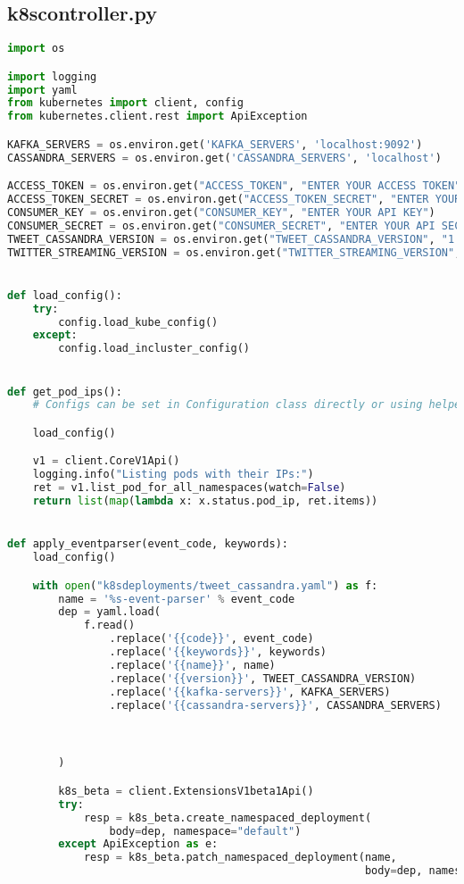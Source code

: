 \newpage
\subsection{k8scontroller.py}

\begin{lstlisting}[language=Python]
import os

import logging
import yaml
from kubernetes import client, config
from kubernetes.client.rest import ApiException

KAFKA_SERVERS = os.environ.get('KAFKA_SERVERS', 'localhost:9092')
CASSANDRA_SERVERS = os.environ.get('CASSANDRA_SERVERS', 'localhost')

ACCESS_TOKEN = os.environ.get("ACCESS_TOKEN", "ENTER YOUR ACCESS TOKEN")
ACCESS_TOKEN_SECRET = os.environ.get("ACCESS_TOKEN_SECRET", "ENTER YOUR ACCESS TOKEN SECRET")
CONSUMER_KEY = os.environ.get("CONSUMER_KEY", "ENTER YOUR API KEY")
CONSUMER_SECRET = os.environ.get("CONSUMER_SECRET", "ENTER YOUR API SECRET")
TWEET_CASSANDRA_VERSION = os.environ.get("TWEET_CASSANDRA_VERSION", "1.2.1")
TWITTER_STREAMING_VERSION = os.environ.get("TWITTER_STREAMING_VERSION", "1.1.0")


def load_config():
    try:
        config.load_kube_config()
    except:
        config.load_incluster_config()


def get_pod_ips():
    # Configs can be set in Configuration class directly or using helper utility

    load_config()

    v1 = client.CoreV1Api()
    logging.info("Listing pods with their IPs:")
    ret = v1.list_pod_for_all_namespaces(watch=False)
    return list(map(lambda x: x.status.pod_ip, ret.items))


def apply_eventparser(event_code, keywords):
    load_config()

    with open("k8sdeployments/tweet_cassandra.yaml") as f:
        name = '%s-event-parser' % event_code
        dep = yaml.load(
            f.read()
                .replace('{{code}}', event_code)
                .replace('{{keywords}}', keywords)
                .replace('{{name}}', name)
                .replace('{{version}}', TWEET_CASSANDRA_VERSION)
                .replace('{{kafka-servers}}', KAFKA_SERVERS)
                .replace('{{cassandra-servers}}', CASSANDRA_SERVERS)



        )

        k8s_beta = client.ExtensionsV1beta1Api()
        try:
            resp = k8s_beta.create_namespaced_deployment(
                body=dep, namespace="default")
        except ApiException as e:
            resp = k8s_beta.patch_namespaced_deployment(name,
                                                        body=dep, namespace="default")


\end{lstlisting}
